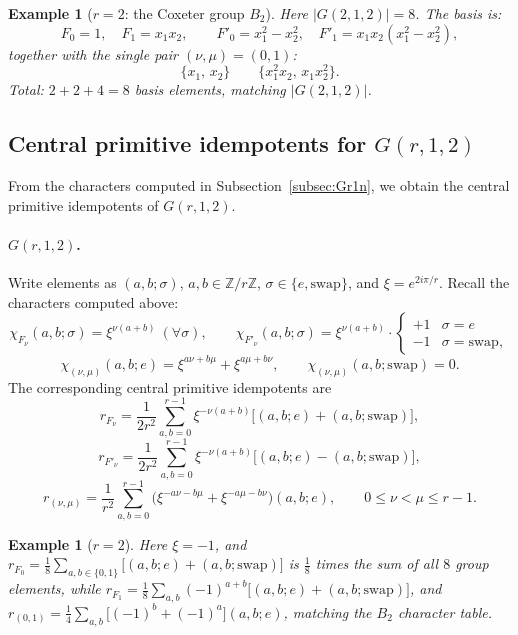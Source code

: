 \documentclass[11pt,a4paper]{article}
\newtheorem{example}[theorem]{Example}
\begin{document}
\begin{example}[$r=2$: the Coxeter group $B_2$]
Here $|G(2,1,2)|=8$. The basis is:
\[
 F_0 = 1,\quad F_1 = x_1x_2, \qquad
 F'_0 = x_1^2-x_2^2,\quad F'_1 = x_1x_2(x_1^2-x_2^2),
\]
together with the single pair $(\nu,\mu)=(0,1)$:
\[
 \{x_1,\, x_2\} \qquad \{x_1^2x_2,\, x_1x_2^2\}.
\]
Total: $2+2+4=8$ basis elements, matching $|G(2,1,2)|$.
\end{example}


\subsection{Central primitive idempotents for $G(r,1,2)$}\label{subsec:Gr1n-idem}

From the characters computed in Subsection~\ref{subsec:Gr1n}, we
obtain the central primitive idempotents of $G(r,1,2)$.

\paragraph{$G(r,1,2)$.}
Write elements as $(a,b;\sigma)$, $a,b \in \mathbb{Z}/r\mathbb{Z}$,
$\sigma \in \{e,\mathrm{swap}\}$, and $\xi = e^{2i\pi/r}$. Recall the
characters computed above:
\[
  \chi_{F_\nu}(a,b;\sigma) = \xi^{\nu(a+b)} \ (\forall \sigma),
  \qquad
  \chi_{F'_\nu}(a,b;\sigma) = \xi^{\nu(a+b)} \cdot
    \begin{cases} +1 & \sigma = e \\ -1 & \sigma = \mathrm{swap}, \end{cases}
\]
\[
  \chi_{(\nu,\mu)}(a,b;e) = \xi^{a\nu+b\mu}+\xi^{a\mu+b\nu},
  \qquad
  \chi_{(\nu,\mu)}(a,b;\mathrm{swap}) = 0.
\]
The corresponding central primitive idempotents are
\[
  r_{F_\nu} = \frac{1}{2r^2} \sum_{a,b=0}^{r-1} \xi^{-\nu(a+b)}
    \big[(a,b;e)+(a,b;\mathrm{swap})\big],
\]
\[
  r_{F'_\nu} = \frac{1}{2r^2} \sum_{a,b=0}^{r-1} \xi^{-\nu(a+b)}
    \big[(a,b;e)-(a,b;\mathrm{swap})\big],
\]
\[
  r_{(\nu,\mu)} = \frac{1}{r^2} \sum_{a,b=0}^{r-1}
    \big(\xi^{-a\nu-b\mu}+\xi^{-a\mu-b\nu}\big)(a,b;e), \qquad 0 \le \nu < \mu \le r-1.
\]

\begin{example}[$r=2$]
Here $\xi=-1$, and $r_{F_0} = \tfrac18\sum_{a,b\in\{0,1\}}\big[(a,b;e)+(a,b;\mathrm{swap})\big]$
is $\tfrac18$ times the sum of all $8$ group elements, while
$r_{F_1} = \tfrac18\sum_{a,b}(-1)^{a+b}\big[(a,b;e)+(a,b;\mathrm{swap})\big]$,
and $r_{(0,1)} = \tfrac14\sum_{a,b}\big[(-1)^{b}+(-1)^{a}\big](a,b;e)$,
matching the $B_2$ character table.
\end{example}
\end{document}
